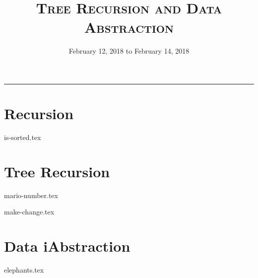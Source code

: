 \documentclass{exam}
\title{\textsc{Tree Recursion and Data Abstraction}}
\date{February 12, 2018 to February 14, 2018}
\begin{document}
\maketitle
\rule{\textwidth}{0.15em}
\fontsize{12}{15}\selectfont


\section{Recursion}
\begin{questions}
{is-sorted.tex}
\end{questions}

\section{Tree Recursion}
\begin{questions}
{mario-number.tex}

{make-change.tex}
\end{questions}


\section{Data iAbstraction}
\begin{questions}
{elephants.tex}
\end{questions}
\end{document}

